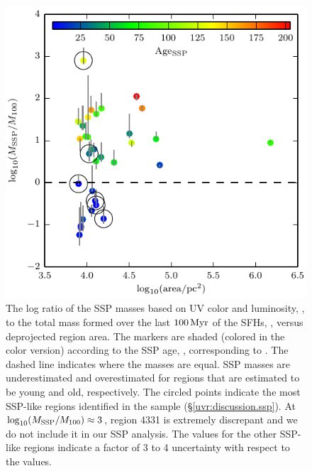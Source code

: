 \begin{figure}
\centering
\includegraphics[scale=1]{uv_regions-figures/mass.pdf}
\caption[The log ratio of the SSP masses based on UV color and luminosity
    to the total mass formed over the last
    $100\myr$ of the SFHs versus deprojected region area.]{The log ratio of the SSP masses based on UV color and luminosity,
    \massssp{}, to the total mass formed over the last
    $100\myr$ of the SFHs, \massoneh, versus deprojected region area.
    The markers are shaded (colored in the color version) according to the SSP
    age, \agessp{}, corresponding to \massssp{}. The dashed
    line indicates where the masses are equal. SSP masses are underestimated
    and overestimated for regions that are estimated to be young and old,
    respectively. The circled points indicate the most SSP-like regions
    identified in the sample (\S \ref{uvr:discussion.ssp}). At
    $\log_{10}(M_{\mathrm{SSP}} / M_{100}) \approx 3$, region 4331 is extremely
    discrepant and we do not include it in our SSP analysis. The
    \massssp{} values for the other SSP-like regions indicate a factor of
    3 to 4 uncertainty with respect to the \massoneh{} values.
}
\label{fig:uvr:masses}
\end{figure}



